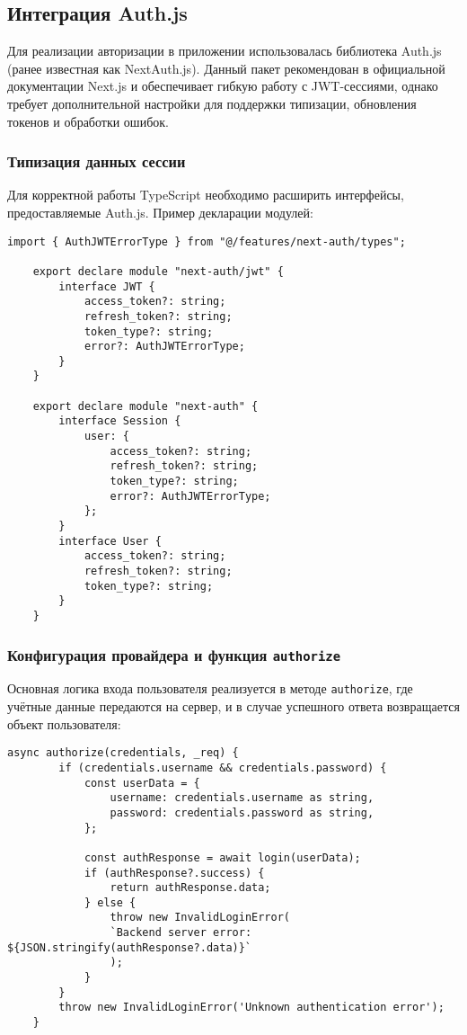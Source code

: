 \subsection{Интеграция Auth.js}
Для реализации авторизации в приложении использовалась библиотека Auth.js (ранее известная как NextAuth.js). Данный пакет рекомендован в официальной документации Next.js и обеспечивает гибкую работу с JWT-сессиями, однако требует дополнительной настройки для поддержки типизации, обновления токенов и обработки ошибок.

\subsubsection{Типизация данных сессии}
Для корректной работы TypeScript необходимо расширить интерфейсы, предоставляемые Auth.js. Пример декларации модулей:
\begin{lstlisting}[caption={Типизация JWT и Session в Auth.js}]
	import { AuthJWTErrorType } from "@/features/next-auth/types";
	
	export declare module "next-auth/jwt" {
		interface JWT {
			access_token?: string;
			refresh_token?: string;
			token_type?: string;
			error?: AuthJWTErrorType;
		}
	}
	
	export declare module "next-auth" {
		interface Session {
			user: {
				access_token?: string;
				refresh_token?: string;
				token_type?: string;
				error?: AuthJWTErrorType;
			};
		}
		interface User {
			access_token?: string;
			refresh_token?: string;
			token_type?: string;
		}
	}
\end{lstlisting}

\subsubsection{Конфигурация провайдера и функция \texttt{authorize}}
Основная логика входа пользователя реализуется в методе \texttt{authorize}, где учётные данные передаются на сервер, и в случае успешного ответа возвращается объект пользователя:
\begin{lstlisting}[caption={Реализация функции authorize}]
	async authorize(credentials, _req) {
		if (credentials.username && credentials.password) {
			const userData = {
				username: credentials.username as string,
				password: credentials.password as string,
			};
			
			const authResponse = await login(userData);
			if (authResponse?.success) {
				return authResponse.data;
			} else {
				throw new InvalidLoginError(
				`Backend server error: ${JSON.stringify(authResponse?.data)}`
				);
			}
		}
		throw new InvalidLoginError('Unknown authentication error');
	}
\end{lstlisting}

